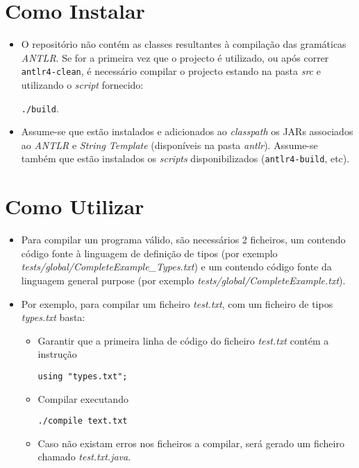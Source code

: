 \documentclass{report}
\begin{document}
\section{Como Instalar}
\begin{itemize}
    \item O repositório não contém as classes resultantes à compilação das gramáticas \textit{ANTLR}. Se for a primeira vez que o projecto é utilizado, ou após correr \texttt{antlr4-clean}, é necessário compilar o projecto estando na pasta \textit{src} e utilizando o \textit{script} fornecido:

\texttt{./build}.

    \item Assume-se que estão instalados e adicionados ao \textit{classpath} os JARs associados ao \textit{ANTLR} e \textit{String Template} (disponíveis na pasta \textit{antlr}). Assume-se também que estão instalados os \textit{scripts} disponibilizados (\texttt{antlr4-build}, etc).
\end{itemize}

\pagebreak
\section{Como Utilizar}
\begin{itemize}
     \item Para compilar um programa válido, são necessários 2 ficheiros, um contendo código fonte à linguagem de definição de tipos (por exemplo \textit{tests/global/CompleteExample\_Types.txt}) e um contendo código fonte da linguagem general purpose (por exemplo \textit{tests/global/CompleteExample.txt}).
     \item Por exemplo, para compilar um ficheiro \textit{test.txt}, com um ficheiro de tipos \textit{types.txt} basta:
     \begin{itemize}
        \item Garantir que a primeira linha de código do ficheiro \textit{test.txt} contém a instrução 
        
        \texttt{using "types.txt";}
        \item Compilar executando 
        
        \texttt{./compile text.txt}
        \item Caso não existam erros nos ficheiros a compilar, será gerado um ficheiro chamado \textit{test.txt.java}. 
     \end{itemize}
\end{itemize}
\end{document}

